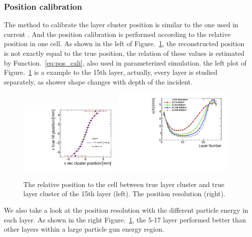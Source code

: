 \subsubsection{Position calibration}

The method to calibrate the layer cluster position is similar to the one used in current \ecal.
And the position calibration is performed according to the relative position in one cell.
As shown in the left of Figure.~\ref{fig:position_rela},
the reconstructed position is not exactly equal to the true position,
the relation of these values is estimated by Function.~\ref{eq:pos_cali}, also used in parameterized simulation.
the left plot of Figure.~\ref{fig:position_rela} is a example to the 15th layer, 
actually, 
every layer is studied separately, 
as shower shape changes with depth of the incident.

\begin{figure}[!tbp]
\centering
\includegraphics[width=0.45\textwidth]{Figures/06_ECAL/position_res_cali/pos_cali_15.pdf}
\includegraphics[width=0.53\textwidth]{Figures/06_ECAL/position_res_cali/pos_res.pdf}
\caption{
   The relative position to the cell between true layer cluster and true layer cluster of the 15th layer (left).
	The position resolution (right).} 
\label{fig:position_rela}
\end{figure}

We also take a look at the position resolution with the different particle energy in each layer.
As shown in the right Figure.~\ref{fig:position_rela},
the 5-17 layer performed better than other layers within a large particle gun energy region.

